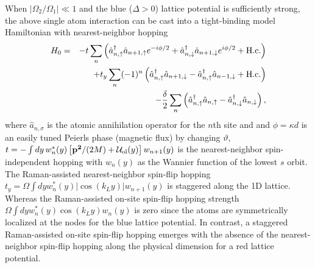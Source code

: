 \documentclass[twocolumn,prl,superscriptaddress,amsmath,amssymb]{revtex4} %
\begin{document}
When $|\Omega_2/\Omega_1|\ll 1$ and the blue ($\Delta>0$) lattice potential is sufficiently strong, the above single atom interaction can be cast into a tight-binding model Hamiltonian with nearest-neighbor hopping
\begin{eqnarray}
{H}_0 &= &- t \sum_n
\left(\hat{a}^\dag_{n,\uparrow}  \hat{a}_{n+1,\uparrow} e^{-i\phi/2} +\hat{a}^\dag_{n,\downarrow}\hat{a}_{n+1,\downarrow}e^{i\phi/2}
+{\rm{H.c.}}\right) \nonumber \\
&&+ t_y \sum_n (-1)^n
\left(\hat{a}^\dag_{n,\uparrow}\hat{a}_{n+1,\downarrow}-
\hat{a}^\dag_{n,\uparrow}\hat{a}_{n-1,\downarrow} +
{\rm{H.c.}}\right)\nonumber \\
&& - \frac{\delta}{2} \sum_n
\left(\hat{a}^\dag_{n,\uparrow}\hat{a}_{n,\uparrow}
-\hat{a}^\dag_{n,\downarrow}\hat{a}_{n,\downarrow}\right),
\label{hamlat}
\end{eqnarray}
where $\hat{a}_{n,\sigma}$ is the atomic annihilation operator for the $n$th site and and $\phi=\kappa d$ is an easily tuned Peierls phase (magnetic flux) by changing ${\vartheta}$, $t=-\int d{{y}}\, w_{{{n}}}^{*}({{y}})\left[{\bf {p^{2}}}/(2M)+{\cal U}_{\text{ol}}({{y}})\right]w_{{{n+1}}}({{y}})$ is the nearest-neighbor spin-independent hopping with $w_{{n}}({y})$ as the Wannier function of the lowest $s$ orbit. The Raman-assisted nearest-neighbor spin-flip hopping $t_{y}\!=\!\Omega\int d{y}w_{n}^{*}({{y}})|\cos(k_Ly) |w_{n+1}({y})$ is staggered along the 1D lattice. Whereas the Raman-assisted on-site spin-flip hopping strength $\Omega\int d{y}w_{n}^{*}({{y}})\cos(k_Ly) w_{n}({y})$ is zero since the atoms are symmetrically localized at the nodes for the blue lattice potential. In contrast, a staggered Raman-assisted on-site spin-flip hopping emerges with the absence of the nearest-neighbor spin-flip hopping along the physical dimension for a red lattice potential.
\end{document}
